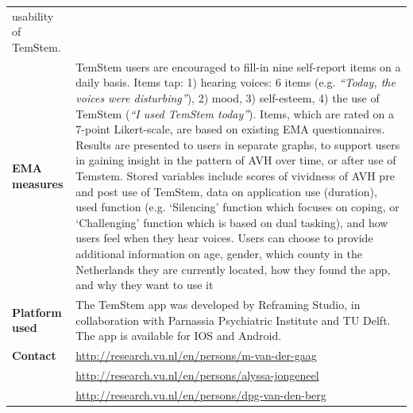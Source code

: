 \documentclass[]{book}
\begin{document}
\begin{longtable}[]{@{}ll@{}}
\begin{minipage}[t]{0.69\columnwidth}
usability of TemStem.\strut
\end{minipage}\tabularnewline
\begin{minipage}[t]{0.25\columnwidth}\raggedright\strut
\textbf{EMA measures}\strut
\end{minipage} & \begin{minipage}[t]{0.69\columnwidth}\raggedright\strut
TemStem users are encouraged to fill-in nine self-report items on a
daily basis. Items tap: 1) hearing voices: 6 items (e.g. \emph{``Today,
the voices were disturbing''}), 2) mood, 3) self-esteem, 4) the use of
TemStem (\emph{``I used TemStem today''}). Items, which are rated on a
7-point Likert-scale, are based on existing EMA questionnaires. Results
are presented to users in separate graphs, to support users in gaining
insight in the pattern of AVH over time, or after use of Temstem. Stored
variables include scores of vividness of AVH pre and post use of
TemStem, data on application use (duration), used function (e.g.
`Silencing' function which focuses on coping, or `Challenging' function
which is based on dual tasking), and how users feel when they hear
voices. Users can choose to provide additional information on age,
gender, which county in the Netherlands they are currently located, how
they found the app, and why they want to use it\strut
\end{minipage}\tabularnewline
\begin{minipage}[t]{0.25\columnwidth}\raggedright\strut
\textbf{Platform used}\strut
\end{minipage} & \begin{minipage}[t]{0.69\columnwidth}\raggedright\strut
The TemStem app was developed by Reframing Studio, in collaboration with
Parnassia Psychiatric Institute and TU Delft. The app is available for
IOS and Android.\strut
\end{minipage}\tabularnewline
\begin{minipage}[t]{0.25\columnwidth}\raggedright\strut
\textbf{Contact}\strut
\end{minipage} & \begin{minipage}[t]{0.69\columnwidth}\raggedright\strut
\url{http://research.vu.nl/en/persons/m-van-der-gaag}\strut
\end{minipage}\tabularnewline
\begin{minipage}[t]{0.25\columnwidth}\raggedright\strut
\strut
\end{minipage} & \begin{minipage}[t]{0.69\columnwidth}\raggedright\strut
\url{http://research.vu.nl/en/persons/alyssa-jongeneel}\strut
\end{minipage}\tabularnewline
\begin{minipage}[t]{0.25\columnwidth}\raggedright\strut
\strut
\end{minipage} & \begin{minipage}[t]{0.69\columnwidth}\raggedright\strut
\url{http://research.vu.nl/en/persons/dpg-van-den-berg}\strut
\end{minipage}\tabularnewline
\bottomrule
\end{longtable}
\end{document}
